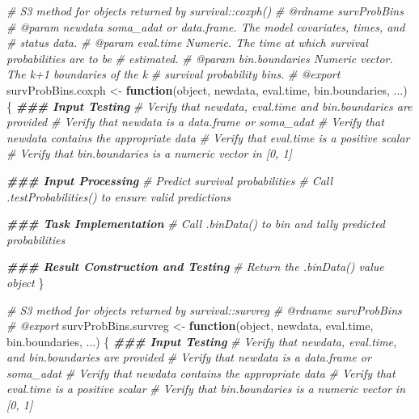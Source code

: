 \documentclass[
]{book}
\newenvironment{Shaded}{\begin{snugshade}}{\end{snugshade}}
\newcommand{\CommentTok}[1]{\textcolor[rgb]{0.56,0.35,0.01}{\textit{#1}}}
\newcommand{\ControlFlowTok}[1]{\textcolor[rgb]{0.13,0.29,0.53}{\textbf{#1}}}
\newcommand{\DocumentationTok}[1]{\textcolor[rgb]{0.56,0.35,0.01}{\textbf{\textit{#1}}}}
\newcommand{\NormalTok}[1]{#1}
\newcommand{\OtherTok}[1]{\textcolor[rgb]{0.56,0.35,0.01}{#1}}
\begin{document}
\begin{Shaded}
\begin{Highlighting}[]
\CommentTok{\#\textquotesingle{} S3 method for objects returned by \textasciigrave{}survival::coxph()\textasciigrave{}}
\CommentTok{\#\textquotesingle{} @rdname survProbBins}
\CommentTok{\#\textquotesingle{} @param newdata soma\_adat or data.frame. The model covariates, times, and}
\CommentTok{\#\textquotesingle{}   status data.}
\CommentTok{\#\textquotesingle{} @param eval.time Numeric. The time at which survival probabilities are to be}
\CommentTok{\#\textquotesingle{}   estimated.}
\CommentTok{\#\textquotesingle{} @param bin.boundaries Numeric vector. The k+1 boundaries of the k}
\CommentTok{\#\textquotesingle{}   survival probability bins.}
\CommentTok{\#\textquotesingle{} @export}
\NormalTok{survProbBins.coxph }\OtherTok{\textless{}{-}} \ControlFlowTok{function}\NormalTok{(object, newdata, eval.time, bin.boundaries, ...) \{}
  \DocumentationTok{\#\#\# Input Testing}
  \CommentTok{\# Verify that \textasciigrave{}newdata\textasciigrave{}, \textasciigrave{}eval.time\textasciigrave{} and \textasciigrave{}bin.boundaries\textasciigrave{} are provided}
  \CommentTok{\# Verify that \textasciigrave{}newdata\textasciigrave{} is a data.frame or soma\_adat}
  \CommentTok{\# Verify that \textasciigrave{}newdata\textasciigrave{} contains the appropriate data}
  \CommentTok{\# Verify that \textasciigrave{}eval.time\textasciigrave{} is a positive scalar}
  \CommentTok{\# Verify that \textasciigrave{}bin.boundaries\textasciigrave{} is a numeric vector in [0, 1]}
  
  \DocumentationTok{\#\#\# Input Processing}
  \CommentTok{\# Predict survival probabilities}
  \CommentTok{\# Call .testProbabilities() to ensure valid predictions}
  
  \DocumentationTok{\#\#\# Task Implementation}
  \CommentTok{\# Call \textasciigrave{}.binData()\textasciigrave{} to bin and tally predicted probabilities}
  
  \DocumentationTok{\#\#\# Result Construction and Testing}
  \CommentTok{\# Return the \textasciigrave{}.binData()\textasciigrave{} value object}
\NormalTok{\}}

\CommentTok{\#\textquotesingle{} S3 method for objects returned by \textasciigrave{}survival::survreg\textasciigrave{}}
\CommentTok{\#\textquotesingle{} @rdname survProbBins}
\CommentTok{\#\textquotesingle{} @export}
\NormalTok{survProbBins.survreg }\OtherTok{\textless{}{-}} \ControlFlowTok{function}\NormalTok{(object, newdata, eval.time, bin.boundaries, ...) \{}
  \DocumentationTok{\#\#\# Input Testing}
  \CommentTok{\# Verify that \textasciigrave{}newdata\textasciigrave{}, \textasciigrave{}eval.time\textasciigrave{}, and \textasciigrave{}bin.boundaries\textasciigrave{} are provided}
  \CommentTok{\# Verify that \textasciigrave{}newdata\textasciigrave{} is a data.frame or soma\_adat}
  \CommentTok{\# Verify that \textasciigrave{}newdata\textasciigrave{} contains the appropriate data}
  \CommentTok{\# Verify that \textasciigrave{}eval.time\textasciigrave{} is a positive scalar}
  \CommentTok{\# Verify that \textasciigrave{}bin.boundaries\textasciigrave{} is a numeric vector in [0, 1]}
  

\end{Highlighting}
\end{Shaded}
\end{document}

